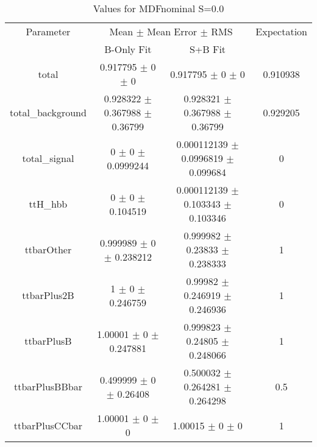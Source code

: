 \begin{table}
\centering
\caption{Values for MDFnominal S=0.0}
\begin{tabular}{cccc}
\toprule
Parameter & \multicolumn{2}{c}{Mean $\pm$ Mean Error $\pm$ RMS} & Expectation\\
 & B-Only Fit & S+B Fit & \\
\midrule
total & \num{0.917795} $\pm$ \num{0} $\pm$ \num{0} & \num{0.917795} $\pm$ \num{0} $\pm$ \num{0} & \num{0.910938}\\
total\_background & \num{0.928322} $\pm$ \num{0.367988} $\pm$ \num{0.36799} & \num{0.928321} $\pm$ \num{0.367988} $\pm$ \num{0.36799} & \num{0.929205}\\
total\_signal & \num{0} $\pm$ \num{0} $\pm$ \num{0.0999244} & \num{0.000112139} $\pm$ \num{0.0996819} $\pm$ \num{0.099684} & \num{0}\\
ttH\_hbb & \num{0} $\pm$ \num{0} $\pm$ \num{0.104519} & \num{0.000112139} $\pm$ \num{0.103343} $\pm$ \num{0.103346} & \num{0}\\
ttbarOther & \num{0.999989} $\pm$ \num{0} $\pm$ \num{0.238212} & \num{0.999982} $\pm$ \num{0.23833} $\pm$ \num{0.238333} & \num{1}\\
ttbarPlus2B & \num{1} $\pm$ \num{0} $\pm$ \num{0.246759} & \num{0.99982} $\pm$ \num{0.246919} $\pm$ \num{0.246936} & \num{1}\\
ttbarPlusB & \num{1.00001} $\pm$ \num{0} $\pm$ \num{0.247881} & \num{0.999823} $\pm$ \num{0.24805} $\pm$ \num{0.248066} & \num{1}\\
ttbarPlusBBbar & \num{0.499999} $\pm$ \num{0} $\pm$ \num{0.26408} & \num{0.500032} $\pm$ \num{0.264281} $\pm$ \num{0.264298} & \num{0.5}\\
ttbarPlusCCbar & \num{1.00001} $\pm$ \num{0} $\pm$ \num{0} & \num{1.00015} $\pm$ \num{0} $\pm$ \num{0} & \num{1}\\
\bottomrule
\end{tabular}
\end{table}